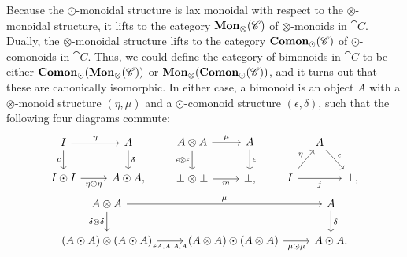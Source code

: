 Because the $\odot$-monoidal structure is lax monoidal with respect to the $\otimes$-monoidal structure, it lifts to the category $\mathbf{Mon}_{\otimes}(\mathscr{C})$ of $\otimes$-monoids in $\cat{C}$. Dually, the $\otimes$-monoidal structure lifts to the category $\mathbf{Comon}_{\odot}(\mathscr{C})$ of $\odot$-comonoids in $\cat{C}$. Thus, we could define the category of bimonoids in $\cat{C}$ to be either $\mathbf{Comon}_{\odot}(\mathbf{Mon}_{\otimes}(\mathscr{C}))$ or $\mathbf{Mon}_{\otimes}(\mathbf{Comon}_{\odot}(\mathscr{C}))$, and it turns out that these are canonically isomorphic. In either case, a bimonoid is an object $A$ with a $\otimes$-monoid structure $(\eta,\mu)$ and a $\odot$-comonoid structure $(\epsilon,\delta)$, such that the following four diagrams commute:
\begin{equation}
\begin{gathered}
\begin{tikzcd}[ampersand replacement=\&]
	I \rar{\eta} \dar[swap]{c} \& A \dar{\delta} \\
	I \odot I \rar[swap]{\eta\odot\eta} \& A\odot A,
\end{tikzcd}
\qquad
\begin{tikzcd}[ampersand replacement=\&]
	A\otimes A \rar{\mu} \dar[swap]{\epsilon\otimes\epsilon} \& A \dar{\epsilon} \\
	\perp\otimes\perp \rar[swap]{m} \& \perp,
\end{tikzcd}
\qquad
\begin{tikzcd}[column sep=small,ampersand replacement=\&]
	{} \& A \drar{\epsilon} \& \\
	I \urar{\eta} \ar{rr}[swap]{j} \&\& \perp,
\end{tikzcd}
\\
\begin{tikzcd}[ampersand replacement=\&]
	A\otimes A \ar{rr}{\mu} \dar[swap]{\delta\otimes\delta} \&\& A \dar{\delta} \\
	(A\odot A)\otimes(A\odot A) \rar[swap]{z_{A,A,A,A}}
		\& (A\otimes A)\odot(A\otimes A) \rar[swap]{\mu\odot\mu}
		\& A\odot A.
\end{tikzcd}
\end{gathered}
\end{equation}

